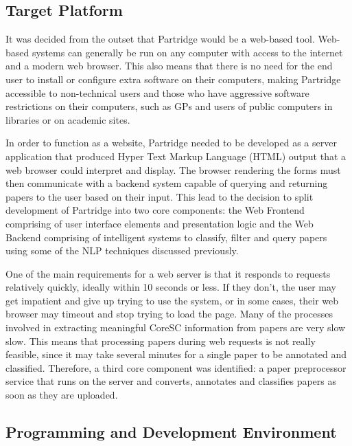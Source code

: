 \subsection{Target Platform}

It was decided from the outset that Partridge would be a web-based tool.
Web-based systems can generally be run on any computer with access to the
internet and a modern web browser. This also means that there is no need for
the end user to install or configure extra software on their computers, making
Partridge accessible to non-technical users and those who have aggressive
software restrictions on their computers, such as GPs and users of public
computers in libraries or on academic sites.

In order to function as a website, Partridge needed to be developed as a server
application that produced Hyper Text Markup Language (HTML) output that a web
browser could interpret and display. The browser rendering the forms must then
communicate with a backend system capable of querying and returning papers to
the user based on their input. This lead to the decision to split development
of Partridge into two core components: the Web Frontend comprising of user
interface elements and presentation logic and the Web Backend comprising of
intelligent systems to classify, filter and query papers using some of the NLP
techniques discussed previously.

One of the main requirements for a web server is that it responds to requests
relatively quickly, ideally within 10 seconds or less. If they don't, the user
may get impatient and give up trying to use the system, or in some cases, their
web browser may timeout and stop trying to load the page. Many of the processes
involved in extracting meaningful CoreSC information from papers are very slow
slow. This means that processing papers during web requests is not really
feasible, since it may take several minutes for a single paper to be annotated
and classified. Therefore, a third core component was identified: a paper
preprocessor service that runs on the server and converts, annotates and
classifies papers as soon as they are uploaded.

\subsection{ Programming and Development Environment }

